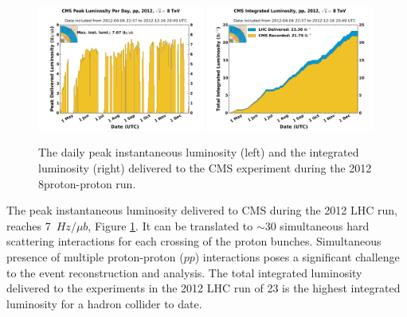 \begin{figure}[htbp]
\centering
\includegraphics[width=0.49\textwidth]{plots/intro/peak_lumi.pdf}
\includegraphics[width=0.49\textwidth]{plots/intro/int_lumi.pdf}
\caption{The daily peak instantaneous luminosity (left) and the integrated luminosity (right)
 delivered to the CMS experiment during the 2012 8\TeV proton-proton run.\label{fig:lumi}}
\end{figure}

The peak instantaneous luminosity delivered to CMS during the 2012 LHC run, 
 reaches 7~$Hz/\mu b$, Figure \ref{fig:lumi}. 
It can be translated to $\sim$30 simultaneous hard scattering interactions 
for each 
crossing of the proton bunches. Simultaneous presence of multiple proton-proton ($pp$) interactions
 poses a significant challenge to the event reconstruction and analysis.
 The total integrated luminosity 
delivered to the experiments in the 2012 LHC run of 23 \fbinv 
is the highest integrated luminosity for a hadron collider 
to date.
